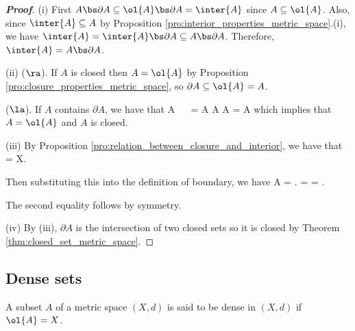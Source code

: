 \begin{proof}[\bf Proof]
\ben
\item [(i)] First $A\bs \partial A \subseteq \ol{A}\bs \partial A = \inter{A}$ since $A\subseteq \ol{A}$. Also, since $\inter{A} \subseteq A$ by Proposition \ref{pro:interior_properties_metric_space}.(i), we have $\inter{A} = \inter{A}\bs \partial A \subseteq A\bs \partial A$. Therefore, $\inter{A} = A\bs \partial A$.
    
\item [(ii)] ($\ra$). If $A$ is closed then $A = \ol{A}$ by Proposition \ref{pro:closure_properties_metric_space}, so $\partial A \subseteq \ol{A} = A$.

($\la$). If $A$ contains $\partial A$, we have that 
\be
{} \subseteq A \ \ra\  = \cup \partial A \subseteq A \cup \partial A = A
\ee
which implies that $A = \ol{A}$ and $A$ is closed.

\item [(iii)] By Proposition \ref{pro:relation_between_closure_and_interior}, we have that 
\be
{} = X\left\bs {}\right.
\ee

Then substituting this into the definition of boundary, we have
\be
\partial A =  \left\bs {}\right. =  \cap {} =  \cap {}.
\ee

The second equality follows by symmetry.

\item [(iv)] By (iii), $\partial A$ is the intersection of two closed sets so it is closed by Theorem \ref{thm:closed_set_metric_space}.
\een
\end{proof}


\subsection{Dense sets}

\begin{definition}\label{def:dense_set_metric_space}
A subset $A$ of a metric space $(X,d)$ is said to be dense in $(X,d)$ if $\ol{A} = X$.
\end{definition}




